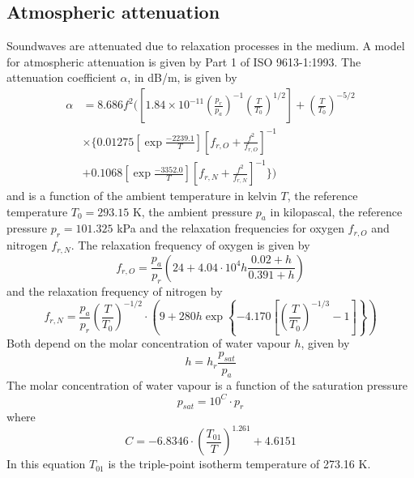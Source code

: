\subsection{Atmospheric attenuation}\label{sec:theory_sound_atmospheric_attenuation}
Soundwaves are attenuated due to relaxation processes in the medium.
A model for atmospheric attenuation is given by Part 1 of ISO 9613-1:1993\cite{ISO9613-1}.
The attenuation coefficient $\alpha$, in dB/m, is given by
\begin{align}
 \alpha &= 8.686 f^2 \Biggl( \left[ 1.84 \times 10^{-11} \left(\frac{p_r}{p_a}\right)^{-1} \left(\frac{T}{T_0}\right)^{1/2} \right] + \left(\frac{T}{T_0}\right)^{-5/2} \nonumber \\ 
 &\times \Biggl\{ 0.01275 \left[ \exp{\frac{-2239.1}{T}} \right]  \left[f_{r,O} + \frac{f^2}{f_{r,O}} \right]^{-1} \nonumber \\
 &+ 0.1068 \left[ \exp{\frac{-3352.0}{T}} \right] \left[ f_{r,N} + \frac{f^2}{f_{r,N}} \right]^{-1} \Biggr\} \Biggr) 
\end{align}
and is a function of the ambient temperature in kelvin $T$, the reference
temperature $T_0=293.15$ K, the ambient pressure $p_a$ in kilopascal, the
reference pressure $p_r=101.325$ kPa and the relaxation frequencies for oxygen 
$f_{r,O}$ and nitrogen $f_{r,N}$.
The relaxation frequency of oxygen is given by
\begin{equation}
 f_{r,O} = \frac{p_a}{p_r} \left( 24 + 4.04 \cdot 10^4 h \frac{0.02 + h}{0.391 + h}  \right)
\end{equation}
and the relaxation frequency of nitrogen by
\begin{equation}
 f_{r,N} = \frac{p_a}{p_r} \left( \frac{T}{T_0} \right)^{-1/2} \cdot \left( 9 + 280 h \exp{\left\{ -4.170 \left[ \left(\frac{T}{T_0} \right)^{-1/3} -1 \right] \right\} } \right)
\end{equation}
Both depend on the molar concentration of water vapour $h$, given by
\begin{equation}
 h = h_r  \frac{p_{sat}}{p_a}
\end{equation}
The molar concentration of water vapour is a function of the saturation pressure
\begin{equation}
 p_{sat} = 10^C \cdot p_r
\end{equation}
where 
\begin{equation}
 C = -6.8346 \cdot \left( \frac{T_{01}}{T} \right)^{1.261}  + 4.6151
\end{equation}
In this equation $T_{01}$ is the triple-point isotherm temperature of 273.16 K.

